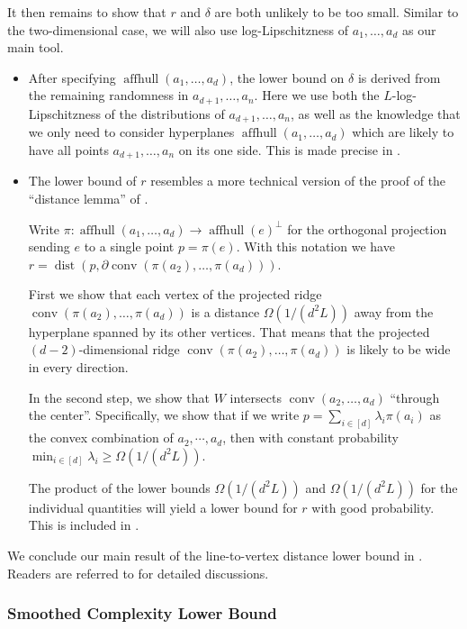 \documentclass{article}\usepackage[a4paper,margin=20mm]{geometry}
\newcommand{\aff}{\operatorname{affhull}}
\newcommand{\conv}{\operatorname{conv}}
\newcommand{\dist}{\operatorname{dist}}
\begin{document}
It then remains to show that $r$ and $\delta$ are both unlikely to be too small. 
Similar to the two-dimensional case, we will also use log-Lipschitzness of $a_1, \ldots, a_d$ as our main tool.
\begin{itemize}
    \item After specifying $\aff(a_1,\dots,a_d)$, the lower bound on $\delta$ is derived from
        the remaining randomness in $a_{d+1},\dots,a_n$. Here we use both the $L$-log-Lipschitzness
        of the distributions of $a_{d+1},\dots,a_n$, as well as the knowledge that
        we only need to consider hyperplanes $\aff(a_1,\dots,a_d)$ which are
        likely to have all points $a_{d+1},\dots,a_n$ on its one side.
        This is made precise in .
    \item The lower bound of $r$ resembles a more technical version of the proof of the ``distance lemma'' of \cite{ST04}.

    Write $\pi : \aff(a_1,\dots,a_d) \to \aff(e)^\perp$
    for the orthogonal projection sending $e$ to a single point $p = \pi(e)$.
    With this notation we have $r = \dist(p, \partial\conv(\pi(a_2),\dots,\pi(a_d)))$.
    
        First we show that each vertex of the projected ridge $\conv(\pi(a_2), \ldots, \pi(a_d))$ is a distance $\Omega(1/(d^2L))$ away from the hyperplane spanned by its other vertices.
        That means that the projected $(d-2)$-dimensional ridge $\conv(\pi(a_2),\dots,\pi(a_d))$ is likely to be wide in every direction.

        In the second step, we show that $W$ intersects $\conv(a_2,\ldots,a_d)$ ``through the center''.
        Specifically, we show that if we write $p = \sum_{i \in [d]} \lambda_i \pi(a_i)$ as the convex combination of $a_2, \cdots, a_d$, 
        then with constant probability $\min_{i \in [d]}\lambda_i \geq \Omega(1/(d^2L))$.

        The product of the lower bounds $
        \Omega(1/(d^2L))$
        and $\Omega(1/(d^2L))$ for the individual quantities
        will yield a lower bound for $r$
        with good probability.
        This is included in .
\end{itemize}

We conclude our main result of the line-to-vertex distance lower bound in . Readers are referred to  for detailed discussions.


\subsubsection{Smoothed Complexity Lower Bound}
\end{document}
